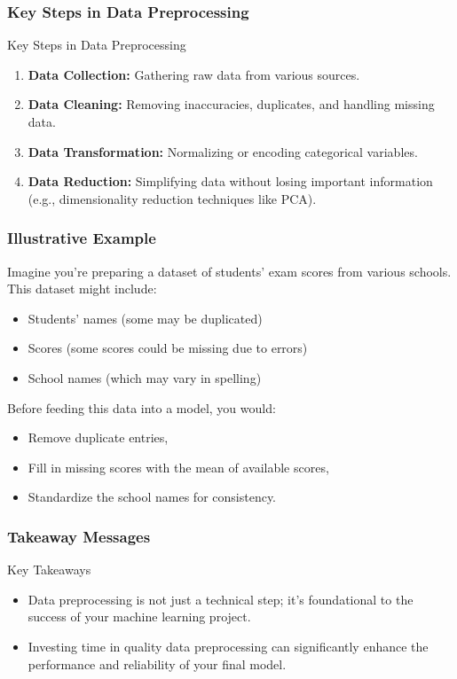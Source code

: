 \documentclass[aspectratio=169]{beamer}
\begin{document}
\begin{frame}[fragile]
    \frametitle{Key Steps in Data Preprocessing}
    \begin{block}{Key Steps in Data Preprocessing}
        \begin{enumerate}
            \item \textbf{Data Collection:} Gathering raw data from various sources.
            \item \textbf{Data Cleaning:} Removing inaccuracies, duplicates, and handling missing data.
            \item \textbf{Data Transformation:} Normalizing or encoding categorical variables.
            \item \textbf{Data Reduction:} Simplifying data without losing important information (e.g., dimensionality reduction techniques like PCA).
        \end{enumerate}
    \end{block}
\end{frame}

\begin{frame}[fragile]
    \frametitle{Illustrative Example}
    Imagine you’re preparing a dataset of students' exam scores from various schools. This dataset might include:
    \begin{itemize}
        \item Students' names (some may be duplicated)
        \item Scores (some scores could be missing due to errors)
        \item School names (which may vary in spelling)
    \end{itemize}
    
    Before feeding this data into a model, you would:
    \begin{itemize}
        \item Remove duplicate entries,
        \item Fill in missing scores with the mean of available scores,
        \item Standardize the school names for consistency.
    \end{itemize}
\end{frame}

\begin{frame}[fragile]
    \frametitle{Takeaway Messages}
    \begin{block}{Key Takeaways}
        \begin{itemize}
            \item Data preprocessing is not just a technical step; it's foundational to the success of your machine learning project.
            \item Investing time in quality data preprocessing can significantly enhance the performance and reliability of your final model.
        \end{itemize}
    \end{block}
\end{frame}
\end{document}
